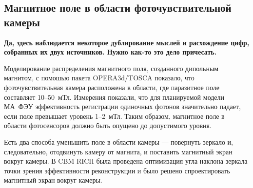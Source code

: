 
\subsection{Магнитное поле в области фоточувствительной камеры}\label{sec:CbmRichMagField}

\todo \textbf{Да, здесь наблюдается некоторое дублирование мыслей и расхождение цифр, собранных их двух источников. Нужно как-то это дело причесать.}

Моделирование распределения магнитного поля, созданного дипольным магнитом, с помошью пакета OPERA3d/TOSCA показало, что фоточувствительная камера расположена в области, где паразитное поле составляет 10--50~мТл. Измерения показали, что для планируемой модели МА~ФЭУ эффективность регистрации одиночных фотонов значительно падает, если поле превышает уровень 1--2~мТл. Таким образом, магнитное поле в области фотосенсоров должно быть опущено до допустимого уровня.


Есть два способа уменьшить поле в области камеры --- повернуть зеркало и, следовательно, отодвинуть камеру от магнита, и поставить магнитный экран вокруг камеры. В CBM RICH была проведена оптимизация угла наклона зеркала точки зрения эффективности реконструкции и было решено спроектировать магнитный экран вокруг камеры.

